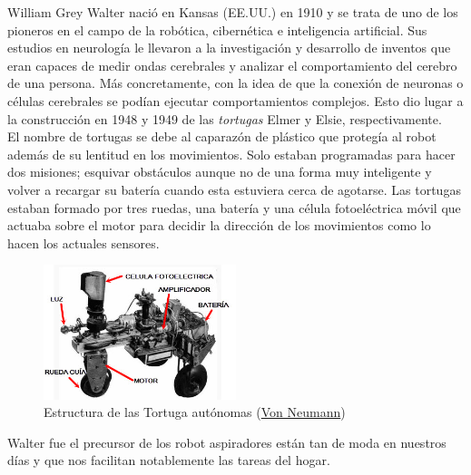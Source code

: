 William Grey Walter nació en Kansas (EE.UU.) en 1910 y se trata de uno de los pioneros en el campo de la robótica, cibernética e inteligencia artificial. Sus estudios en neurología le llevaron a la investigación y desarrollo de inventos que eran capaces de medir ondas cerebrales y analizar el comportamiento del cerebro de una persona. Más concretamente, con la idea de que la conexión de neuronas o células cerebrales se podían ejecutar comportamientos complejos. Esto dio lugar a la construcción en 1948 y 1949 de las \textit{tortugas} Elmer y Elsie, respectivamente.\\

El nombre de tortugas se debe al caparazón de plástico que protegía al robot además de su lentitud en los movimientos. Solo estaban programadas para hacer dos misiones; esquivar obstáculos aunque no de una forma muy inteligente y volver a recargar su batería cuando esta estuviera cerca de agotarse. Las tortugas estaban formado por tres ruedas, una batería y una célula fotoeléctrica móvil que actuaba sobre el motor para decidir la dirección de los movimientos como lo hacen los actuales sensores.

\begin{figure}[H]
\begin{center}
  \includegraphics[width=0.5\textwidth]{./EtapaPrimeriza/imagenes/t1.jpg}
  \caption{Estructura de las Tortuga autónomas (\href{https://vonneumannmachine.files.wordpress.com/2011/05/elsie.jpg} {Von Neumann})}
  \label{t1}
\end{center}
\end{figure}


Walter fue el precursor de los robot aspiradores están tan de moda en nuestros días y que nos facilitan notablemente las tareas del hogar.
